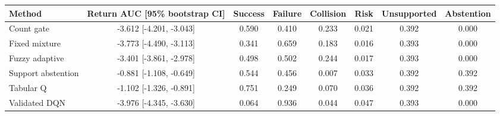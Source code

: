 \begin{tabular}{lccccccc}
\toprule
Method & Return AUC [95\% bootstrap CI] & Success & Failure & Collision & Risk & Unsupported & Abstention \\
\midrule
Count gate & -3.612 [-4.201, -3.043] & 0.590 & 0.410 & 0.233 & 0.021 & 0.392 & 0.000 \\
Fixed mixture & -3.773 [-4.490, -3.113] & 0.341 & 0.659 & 0.183 & 0.016 & 0.393 & 0.000 \\
Fuzzy adaptive & -3.401 [-3.861, -2.978] & 0.498 & 0.502 & 0.244 & 0.017 & 0.393 & 0.000 \\
Support abstention & -0.881 [-1.108, -0.649] & 0.544 & 0.456 & 0.007 & 0.033 & 0.392 & 0.392 \\
Tabular Q & -1.102 [-1.326, -0.891] & 0.751 & 0.249 & 0.070 & 0.036 & 0.392 & 0.392 \\
Validated DQN & -3.976 [-4.345, -3.630] & 0.064 & 0.936 & 0.044 & 0.047 & 0.393 & 0.000 \\
\bottomrule
\end{tabular}
